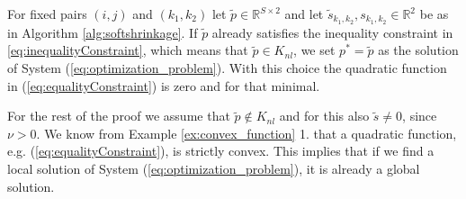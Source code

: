 \documentclass[abstracton]{scrreprt}
\newenvironment{proof}[1][Proof]{\begin{trivlist}
\item[\hskip \labelsep {\bfseries #1}]}{\end{trivlist}}
\begin{document}
            \begin{proof}
            For fixed pairs $(i,j)$ and $(k_{1}, k_{2})$ let $\tilde{p} \in \mathbb{R}^{S \times 2}$ and let $\tilde{s}_{k_{1}, k_{2}}, s_{k_{1}, k_{2}} \in \mathbb{R}^{2}$ be as in Algorithm \ref{alg:softshrinkage}. If $\tilde{p}$ already satisfies the inequality constraint in \ref{eq:inequalityConstraint}, which means that $\tilde{p} \in K_{nl}$, we set $p^{\ast} = \tilde{p}$ as the solution of System (\ref{eq:optimization_problem}). With this choice the quadratic function in (\ref{eq:equalityConstraint}) is zero and for that minimal.

            For the rest of the proof we assume that $\tilde{p} \notin K_{nl}$ and for this also $\tilde{s} \neq 0$, since $\nu > 0$. We know from Example \ref{ex:convex_function} 1. that a quadratic function, e.g. (\ref{eq:equalityConstraint}), is strictly convex. This implies that if we find a local solution of System (\ref{eq:optimization_problem}), it is already a global solution.


\end{proof}
\end{document}
